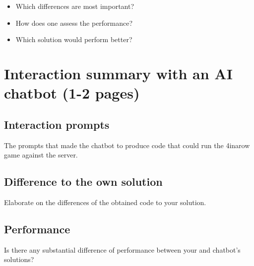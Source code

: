 \documentclass[a4paper]{article}
\begin{document}
\begin{itemize}
\item Which differences are most important?
\item How does one assess the performance?
\item Which solution would perform better?
\end{itemize}

\section{Interaction summary with an AI chatbot (1-2 pages)}

\subsection{Interaction prompts}

The prompts that made the chatbot to produce code that could run the
4inarow game against the server.

\subsection{Difference to the own solution}

Elaborate on the differences of the obtained code to your solution.

\subsection{Performance}

Is there any substantial difference of performance between your and
chatbot's solutions?
\end{document}
